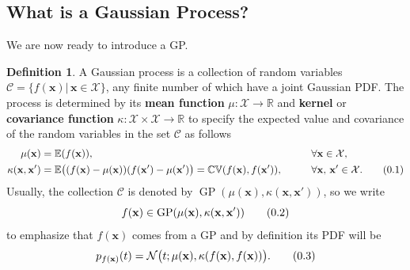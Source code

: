 \documentclass[10pt]{article}
\theoremstyle{definition}
\newtheorem{defn}{Definition}[section]
\newcommand\eqnum{\addtocounter{equation}{1}\tag{\arabic{section}.\arabic{equation}}}
\DeclareMathOperator{\cov}{\mathbb{CV}}
\DeclareMathOperator{\gp}{GP}
\begin{document}
\subsection{What is a Gaussian Process?}
We are now ready to introduce a GP.
\begin{defn}
A Gaussian process is a collection of random variables $\mathscr{C} = \{f(\mathbf{x})|\,\mathbf{x}\in\mathcal{X}\}$, any finite number of which have a joint Gaussian PDF. The process is determined by its \textbf{mean function} $\mu: \mathcal{X} \to \mathbb{R}$ and \textbf{kernel} or \textbf{covariance function} $\kappa: \mathcal{X} \times\mathcal{X} \to \mathbb{R}$ to specify the expected value and covariance of the random variables in the set $\mathscr{C}$ as follows
\begin{alignat*}{2}
\mu(\mathbf{x}) &= \mathbb{E}(f(\mathbf{x})), && \forall \mathbf{x}\in\mathcal{X}, \\
\kappa(\mathbf{x},\mathbf{x}') &= \mathbb{E}\big((f(\mathbf{x})-\mu(\mathbf{x}))(f(\mathbf{x}')-\mu(\mathbf{x}')\big) = \cov(f(\mathbf{x}), f(\mathbf{x}')), \qquad && \forall \mathbf{x},\, \mathbf{x}'\in\mathcal{X}.
\eqnum
\label{eq:GP:def}
\end{alignat*}
Usually, the collection $\mathscr{C}$ is denoted by $\gp(\mu(\mathbf{x}), \kappa(\mathbf{x},\mathbf{x}'))$, so we write
\begin{equation*}
f(\mathbf{x}) \in \gp(\mu(\mathbf{x}), \kappa(\mathbf{x},\mathbf{x}'))
\eqnum
\end{equation*}
to emphasize that $f(\mathbf{x})$ comes from a GP and by definition its PDF will be
\begin{equation*}
p_{f(\mathbf{x})}(t) = \mathcal{N}\big(t; \mu(\mathbf{x}), \kappa(f(\mathbf{x}), f(\mathbf{x}))\big).
\eqnum
\end{equation*}
\end{defn}
\end{document}
